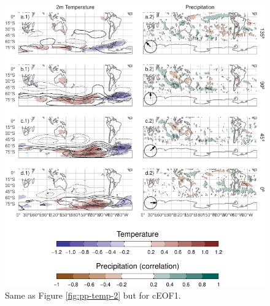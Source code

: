\documentclass[pdflatex,sn-basic]{sn-jnl}
\theoremstyle{thmstyleone}%
\theoremstyle{thmstyletwo}%
\theoremstyle{thmstylethree}%
\begin{document}
\begin{figure}
\centering
\includegraphics{../figures/pp-temp-1-1.pdf}
\caption{\label{fig:pp-temp-1}Same as Figure \ref{fig:pp-temp-2} but for cEOF1.}
\end{figure}



\end{document}
